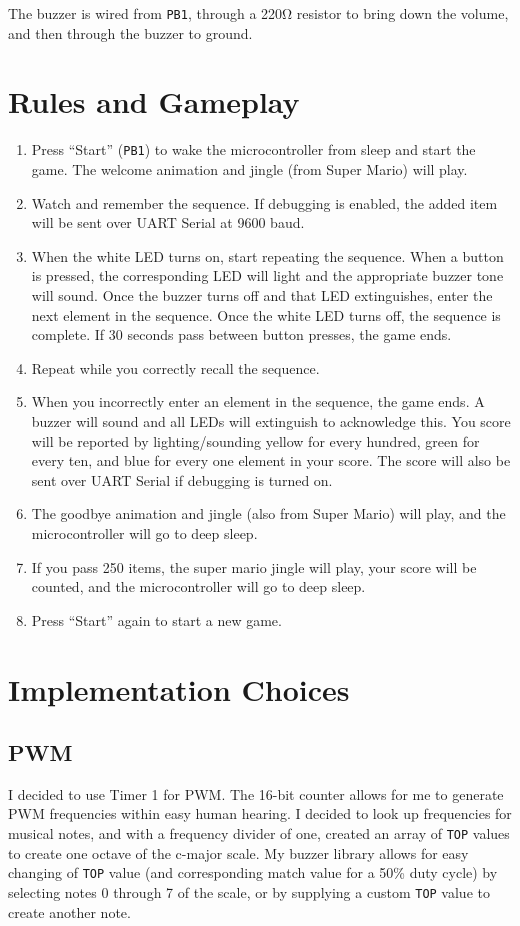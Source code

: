 \documentclass[11pt]{article}
\begin{document}
The buzzer is wired from \texttt{PB1}, through a 220\si{\ohm} resistor to bring down 
the volume, and then through the buzzer to ground.

\section{Rules and Gameplay}
\begin{enumerate}
  \item Press ``Start'' (\texttt{PB1}) to wake the microcontroller from sleep and start the game. 
        The welcome animation and jingle (from Super Mario) will play.
  \item Watch and remember the sequence. If debugging is enabled, the added item will be sent over 
        UART Serial at 9600 baud.
  \item When the white LED turns on, start repeating the sequence. When a button is pressed, the corresponding 
        LED will light and the appropriate buzzer tone will sound. Once the buzzer turns off and that LED 
        extinguishes, enter the next element in the sequence. Once the white LED turns off, the sequence 
        is complete. If 30 seconds pass between button presses, the game ends.
  \item Repeat while you correctly recall the sequence.
  \item When you incorrectly enter an element in the sequence, the game ends. A buzzer will sound and all 
        LEDs will extinguish to acknowledge this. You score will be reported by lighting/sounding yellow 
        for every hundred, green for every ten, and blue for every one element in your score. The score 
        will also be sent over UART Serial if debugging is turned on.
  \item The goodbye animation and jingle (also from Super Mario) will play, and the microcontroller 
        will go to deep sleep.
  \item If you pass 250 items, the super mario jingle will play, your score will be counted, and the microcontroller 
        will go to deep sleep.
  \item Press ``Start'' again to start a new game.
\end{enumerate}

\section{Implementation Choices}
\subsection{PWM}
I decided to use Timer 1 for PWM. The 16-bit counter allows for me to generate 
PWM frequencies within easy human hearing. I decided to look up frequencies for 
musical notes, and with a frequency divider of one, created an array of \texttt{TOP} 
values to create one octave of the c-major scale. My buzzer library allows for 
easy changing of \texttt{TOP} value (and corresponding match value for a 50\% 
duty cycle) by selecting notes 0 through 7 of the scale, or by supplying a custom 
\texttt{TOP} value to create another note.
\end{document}
